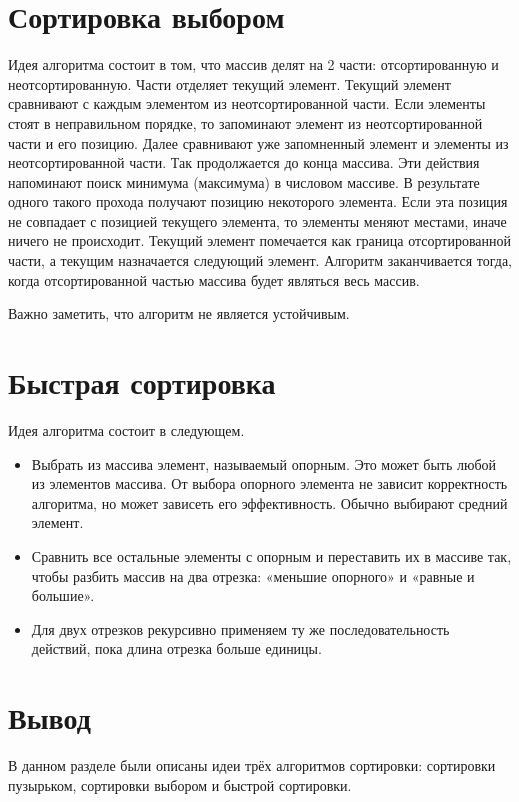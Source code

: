\documentclass{report}
\begin{document}
\section{Сортировка выбором}

Идея алгоритма состоит в том, что массив делят на 2 части: отсортированную и неотсортированную. Части отделяет текущий элемент. Текущий элемент сравнивают с каждым элементом из неотсортированной части. Если элементы стоят в неправильном порядке, то запоминают элемент из неотсортированной части и его позицию. Далее сравнивают уже запомненный элемент и элементы из неотсортированной части. Так продолжается до конца массива. Эти действия напоминают поиск минимума (максимума) в числовом массиве. В результате одного такого прохода получают позицию некоторого элемента. Если эта позиция не совпадает с позицией текущего элемента, то элементы меняют местами, иначе ничего не происходит. Текущий элемент помечается как граница отсортированной части, а текущим назначается следующий элемент. Алгоритм заканчивается тогда, когда отсортированной частью массива будет являться весь массив. 

Важно заметить, что алгоритм не является устойчивым.

\section{Быстрая сортировка}

Идея алгоритма состоит в следующем.

\begin{itemize}
	\item Выбрать из массива элемент, называемый опорным. Это может быть любой из элементов массива. От выбора опорного элемента не зависит корректность алгоритма, но может зависеть его эффективность. Обычно выбирают средний элемент.
	\item Сравнить все остальные элементы с опорным и переставить их в массиве так, чтобы разбить массив на два отрезка: «меньшие опорного» и «равные и большие».
	\item Для двух отрезков рекурсивно применяем ту же последовательность действий, пока длина отрезка больше единицы.
\end{itemize}

\section{Вывод}

В данном разделе были описаны идеи трёх алгоритмов сортировки: сортировки пузырьком, сортировки выбором и быстрой сортировки.
	
\end{document}
